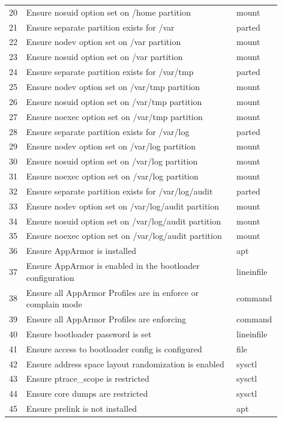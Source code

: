 \begin{longtable}{|p{0.05\linewidth}|p{0.75\linewidth}|p{0.1\linewidth}|}
20 & Ensure nosuid option set on /home partition & mount \\
21 & Ensure separate partition exists for /var & parted \\
22 & Ensure nodev option set on /var partition & mount \\
23 & Ensure nosuid option set on /var partition & mount \\
24 & Ensure separate partition exists for /var/tmp & parted \\
25 & Ensure nodev option set on /var/tmp partition & mount \\
26 & Ensure nosuid option set on /var/tmp partition & mount \\
27 & Ensure noexec option set on /var/tmp partition & mount \\
28 & Ensure separate partition exists for /var/log & parted \\
29 & Ensure nodev option set on /var/log partition & mount \\
30 & Ensure nosuid option set on /var/log partition & mount \\
31 & Ensure noexec option set on /var/log partition & mount \\
32 & Ensure separate partition exists for /var/log/audit & parted \\
33 & Ensure nodev option set on /var/log/audit partition & mount \\
34 & Ensure nosuid option set on /var/log/audit partition & mount \\
35 & Ensure noexec option set on /var/log/audit partition & mount \\
36 & Ensure AppArmor is installed & apt \\
37 & Ensure AppArmor is enabled in the bootloader configuration & lineinfile \\
38 & Ensure all AppArmor Profiles are in enforce or complain mode & command \\
39 & Ensure all AppArmor Profiles are enforcing & command \\
40 & Ensure bootloader password is set & lineinfile \\
41 & Ensure access to bootloader config is configured & file \\
42 & Ensure address space layout randomization is enabled & sysctl \\
43 & Ensure ptrace\_scope is restricted & sysctl \\
44 & Ensure core dumps are restricted & sysctl \\
45 & Ensure prelink is not installed & apt \\

\end{longtable}

